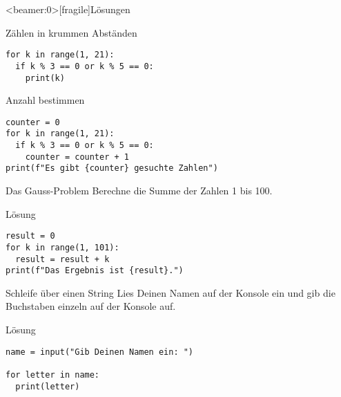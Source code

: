 \begin{frame}<beamer:0>[fragile]{Lösungen}


\begin{solutionblock}{Zählen in krummen Abständen}
\begin{verbatim}
for k in range(1, 21):
  if k % 3 == 0 or k % 5 == 0: 
    print(k)
\end{verbatim}
\end{solutionblock}

\vspace{12pt}

\begin{solutionblock}{Anzahl bestimmen}
\begin{verbatim}
counter = 0
for k in range(1, 21):
  if k % 3 == 0 or k % 5 == 0:
    counter = counter + 1 
print(f"Es gibt {counter} gesuchte Zahlen")
\end{verbatim}
\end{solutionblock}

\end{frame}


\begin{fragile}
	
\begin{block}{Das Gauss-Problem}
\vspace{2pt}	
Berechne die Summe der Zahlen 1 bis 100. 
\end{block}
\vspace{12pt}
\begin{solutionblock}{Lösung}
\begin{verbatim}
result = 0
for k in range(1, 101):
  result = result + k
print(f"Das Ergebnis ist {result}.")
\end{verbatim}
\end{solutionblock}

	
	
\end{fragile}


\begin{fragile}[Übung]
\begin{block}{Schleife über einen String}
\vspace{2pt}
Lies Deinen Namen auf der Konsole ein und gib die Buchstaben einzeln auf der Konsole auf. 
\end{block}
\vspace{12pt}
\begin{solutionblock}{Lösung}
\begin{verbatim}
name = input("Gib Deinen Namen ein: ")

for letter in name:
  print(letter)
\end{verbatim}
\end{solutionblock}
\end{fragile}




